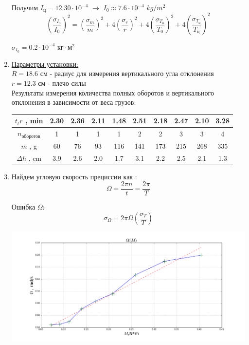 \documentclass[8pt]{article}
\begin{document}
\begin{enumerate}
    Получим $I_{\text{ц}}=12.30 \cdot 10^{-4}$ $\rightarrow$ $I_{0} \approx 7.6 \cdot 10^{-4}$  $kg/m^2$  \\
    $$\left(\frac{\sigma_{I_0}}{I_0}\right)^2 
    = \left(\frac{\sigma_{m}}{m}\right)^2
    + 4\left(\frac{\sigma_{r}}{r}\right)^2
    + 4\left(\frac{\sigma_{T_0}}{T_0}\right)^2
    + 4\left(\frac{\sigma_{T_\text{ц}}}{T_\text{ц}}\right)^2$$
    
    $\sigma_{I_0} = 0.2 \cdot 10^{-4} \text{ кг}\cdot\text{м}^2$
    \item
    \underline{Параметры установки:} \\ 
        $R = 18.6$ см - радиус для измерения вертикального угла отклонения \\
        $r = 12.3$ см - плечо силы \\

        Результаты измерения количества полных оборотов и вертикального отклонения в зависимости от веса грузов:
                    \begin{center}
                    \begin{tabular}{|c|c|c|c|c|c|c|c|c|c|}
                        \hline
                            $t_tr$ , min & 2.30 & 2.36 & 2.11 & 1.48 & 2.51 & 2.18 & 2.47 & 2.10 & 3.28 \\
                            \hline
                            $n_\text{оборотов}$ & 1 &1 &1 &1&2&2&3&3&4 \\
                            \hline
                            $m$ , g  & 60 &76&93&116&141&173&215&268&335 \\
                            \hline
                            $\Delta h$ , cm & 3.9& 2.6& 2.0& 1.7& 3.1& 2.2& 2.5& 2.1& 1.3 \\
                            \hline
                    \end{tabular}
                    \end{center}
    \item Найдем угловую скорость прециссии как :
    $$\Omega = \frac{2\pi n}{t} = \frac{2\pi}{T}$$
    
    Ошибка $\Omega$:
    $$ \sigma_{\Omega} = 2 \pi \Omega \left(\frac{\sigma_{T}}{T}\right)$$

    \begin{center} 
        \includegraphics[width=6.5in]{graph.png} 


\end{center}
\end{enumerate}
\end{document}
